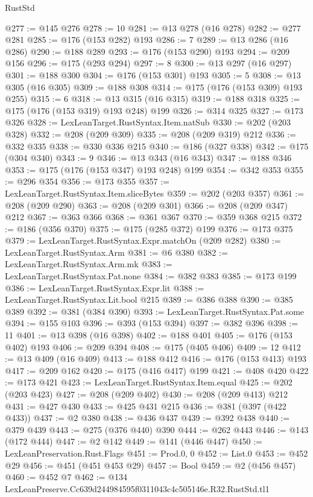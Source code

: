 \begin{lexlean}{RustStd}
\begin{coremodule}
@277 := @145 @276
@278 := 10
@281 := @13 @278 (@16 @278)
@282 := @277 @281
@285 := @176 (@153 @282) @193
@286 := 7
@289 := @13 @286 (@16 @286)
@290 := @188 @289
@293 := @176 (@153 @290) @193
@294 := @209 @156
@296 := @175 (@293 @294)
@297 := 8
@300 := @13 @297 (@16 @297)
@301 := @188 @300
@304 := @176 (@153 @301) @193
@305 := 5
@308 := @13 @305 (@16 @305)
@309 := @188 @308
@314 := @175 (@176 (@153 @309) @193 @255)
@315 := 6
@318 := @13 @315 (@16 @315)
@319 := @188 @318
@325 := @175 (@176 (@153 @319) @193 @248) @199
@326 := @314 @325
@327 := @173 @326
@328 := LexLeanTarget.RustSyntax.Item.natSub
@330 := @202 (@203 @328)
@332 := @208 (@209 @309)
@335 := @208 (@209 @319) @212
@336 := @332 @335
@338 := @330 @336 @215
@340 := @186 (@327 @338)
@342 := @175 (@304 @340)
@343 := 9
@346 := @13 @343 (@16 @343)
@347 := @188 @346
@353 := @175 (@176 (@153 @347) @193 @248) @199
@354 := @342 @353
@355 := @296 @354
@356 := @173 @355
@357 := LexLeanTarget.RustSyntax.Item.sliceBytes
@359 := @202 (@203 @357)
@361 := @208 (@209 @290)
@363 := @208 (@209 @301)
@366 := @208 (@209 @347) @212
@367 := @363 @366
@368 := @361 @367
@370 := @359 @368 @215
@372 := @186 (@356 @370)
@375 := @175 (@285 @372) @199
@376 := @173 @375
@379 := LexLeanTarget.RustSyntax.Expr.matchOn (@209 @282)
@380 := LexLeanTarget.RustSyntax.Arm
@381 := @6 @380
@382 := LexLeanTarget.RustSyntax.Arm.mk
@383 := LexLeanTarget.RustSyntax.Pat.none
@384 := @382 @383
@385 := @173 @199
@386 := LexLeanTarget.RustSyntax.Expr.lit
@388 := LexLeanTarget.RustSyntax.Lit.bool @215
@389 := @386 @388
@390 := @385 @389
@392 := @381 (@384 @390)
@393 := LexLeanTarget.RustSyntax.Pat.some
@394 := @155 @103
@396 := @393 (@153 @394)
@397 := @382 @396
@398 := 11
@401 := @13 @398 (@16 @398)
@402 := @188 @401
@405 := @176 (@153 @402) @193
@406 := @209 @394
@408 := @175 (@405 @406)
@409 := 12
@412 := @13 @409 (@16 @409)
@413 := @188 @412
@416 := @176 (@153 @413) @193
@417 := @209 @162
@420 := @175 (@416 @417) @199
@421 := @408 @420
@422 := @173 @421
@423 := LexLeanTarget.RustSyntax.Item.equal
@425 := @202 (@203 @423)
@427 := @208 (@209 @402)
@430 := @208 (@209 @413) @212
@431 := @427 @430
@433 := @425 @431 @215
@436 := @381 (@397 (@422 @433))
@437 := @2 @380
@438 := @436 @437
@439 := @392 @438
@440 := @379 @439
@443 := @275 (@376 @440) @390
@444 := @262 @443
@446 := @143 (@172 @444)
@447 := @2 @142
@449 := @141 (@446 @447)
@450 := LexLeanPreservation.Rust.Flags
@451 := Prod.{0, 0}
@452 := List.{0}
@453 := @452 @29
@456 := @451 (@451 @453 @29)
@457 := Bool
@459 := @2 (@456 @457)
@460 := @452 @7
@462 := @134 LexLeanPreserve.Cc639d244984595f0311043c4c505146e.R32.RustStd.tl1

\end{coremodule}
\end{lexlean}
